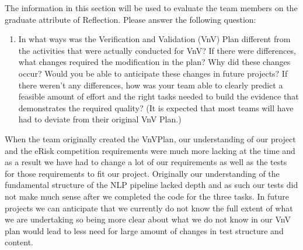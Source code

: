 \documentclass[12pt, titlepage]{article}
\begin{document}
The information in this section will be used to evaluate the team members on the
graduate attribute of Reflection.  Please answer the following question:

\begin{enumerate}
  \item In what ways was the Verification and Validation (VnV) Plan different
  from the activities that were actually conducted for VnV?  If there were
  differences, what changes required the modification in the plan?  Why did
  these changes occur?  Would you be able to anticipate these changes in future
  projects?  If there weren't any differences, how was your team able to clearly
  predict a feasible amount of effort and the right tasks needed to build the
  evidence that demonstrates the required quality?  (It is expected that most
  teams will have had to deviate from their original VnV Plan.)
\end{enumerate}

When the team originally created the VnVPlan, our understanding of our project and the eRisk competition requirements were much more lacking at the time and as a result we have had to change a lot of our requirements as well as the tests for those requirements to fit our project. Originally our understanding of the fundamental structure of the NLP pipeline lacked depth and as such our tests did not make much sense after we completed the code for the three tasks. In future projects we can anticipate that we currently do not know the full extent of what we are undertaking so being more clear about what we do not know in our VnV plan would lead to less need for large amount of changes in test structure and content.
\end{document}
